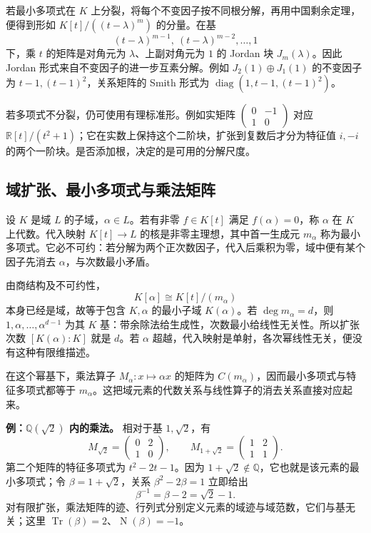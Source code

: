 \documentclass[12pt,fontset=fandol]{ctexart}
\begin{document}
若最小多项式在 $K$ 上分裂，将每个不变因子按不同根分解，再用中国剩余定理，便得到形如 $K[t]/((t-\lambda)^m)$ 的分量。在基
\[
(t-\lambda)^{m-1},\ (t-\lambda)^{m-2},\ldots,1
\]
下，乘 $t$ 的矩阵是对角元为 $\lambda$、上副对角元为 $1$ 的 Jordan 块 $J_m(\lambda)$。因此 Jordan 形式来自不变因子的进一步互素分解。例如 $J_2(1)\oplus J_1(1)$ 的不变因子为 $t-1,(t-1)^2$，关系矩阵的 Smith 形式为 $\operatorname{diag}(1,t-1,(t-1)^2)$。

若多项式不分裂，仍可使用有理标准形。例如实矩阵 $\begin{pmatrix}0&-1\\1&0\end{pmatrix}$ 对应 $\mathbb R[t]/(t^2+1)$；它在实数上保持这个二阶块，扩张到复数后才分为特征值 $i,-i$ 的两个一阶块。是否添加根，决定的是可用的分解尺度。

\subsection{域扩张、最小多项式与乘法矩阵}

\label{app:algebra-extension}

设 $K$ 是域 $L$ 的子域，$\alpha\in L$。若有非零 $f\in K[t]$ 满足 $f(\alpha)=0$，称 $\alpha$ 在 $K$ 上代数。代入映射 $K[t]\to L$ 的核是非零主理想，其中首一生成元 $m_\alpha$ 称为最小多项式。它必不可约：若分解为两个正次数因子，代入后乘积为零，域中便有某个因子先消去 $\alpha$，与次数最小矛盾。

由商结构及不可约性，
\[
K[\alpha]\cong K[t]/(m_\alpha)
\]
本身已经是域，故等于包含 $K,\alpha$ 的最小子域 $K(\alpha)$。若 $\deg m_\alpha=d$，则 $1,\alpha,\ldots,\alpha^{d-1}$ 为其 $K$ 基：带余除法给生成性，次数最小给线性无关性。所以扩张次数 $[K(\alpha):K]$ 就是 $d$。若 $\alpha$ 超越，代入映射是单射，各次幂线性无关，便没有这种有限维描述。

在这个幂基下，乘法算子 $M_\alpha:x\mapsto\alpha x$ 的矩阵为 $C(m_\alpha)$，因而最小多项式与特征多项式都等于 $m_\alpha$。这把域元素的代数关系与线性算子的消去关系直接对应起来。

\textbf{例：$\mathbb Q(\sqrt2)$ 内的乘法。} 相对于基 $1,\sqrt2$，有
\[
M_{\sqrt2}=\begin{pmatrix}0&2\\1&0\end{pmatrix},
\qquad
M_{1+\sqrt2}=\begin{pmatrix}1&2\\1&1\end{pmatrix}.
\]
第二个矩阵的特征多项式为 $t^2-2t-1$。因为 $1+\sqrt2\notin\mathbb Q$，它也就是该元素的最小多项式；令 $\beta=1+\sqrt2$，关系 $\beta^2-2\beta=1$ 立即给出
\[
\beta^{-1}=\beta-2=\sqrt2-1.
\]
对有限扩张，乘法矩阵的迹、行列式分别定义元素的域迹与域范数，它们与基无关；这里 $\operatorname{Tr}(\beta)=2$、$\operatorname{N}(\beta)=-1$。
\end{document}
